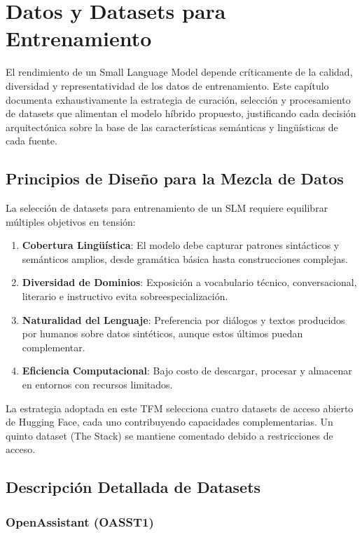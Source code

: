 \section{Datos y Datasets para Entrenamiento}
\label{sec:datasets}

El rendimiento de un Small Language Model depende críticamente de la calidad, diversidad y representatividad de los datos de entrenamiento. Este capítulo documenta exhaustivamente la estrategia de curación, selección y procesamiento de datasets que alimentan el modelo híbrido propuesto, justificando cada decisión arquitectónica sobre la base de las características semánticas y lingüísticas de cada fuente.

\subsection{Principios de Diseño para la Mezcla de Datos}

La selección de datasets para entrenamiento de un SLM requiere equilibrar múltiples objetivos en tensión:

\begin{enumerate}
    \item \textbf{Cobertura Lingüística}: El modelo debe capturar patrones sintácticos y semánticos amplios, desde gramática básica hasta construcciones complejas.
    \item \textbf{Diversidad de Dominios}: Exposición a vocabulario técnico, conversacional, literario e instructivo evita sobreespecialización.
    \item \textbf{Naturalidad del Lenguaje}: Preferencia por diálogos y textos producidos por humanos sobre datos sintéticos, aunque estos últimos puedan complementar.
    \item \textbf{Eficiencia Computacional}: Bajo costo de descargar, procesar y almacenar en entornos con recursos limitados.
\end{enumerate}

La estrategia adoptada en este TFM selecciona cuatro datasets de acceso abierto de Hugging Face, cada uno contribuyendo capacidades complementarias. Un quinto dataset (The Stack) se mantiene comentado debido a restricciones de acceso.

\subsection{Descripción Detallada de Datasets}

\subsubsection{OpenAssistant (OASST1)}

